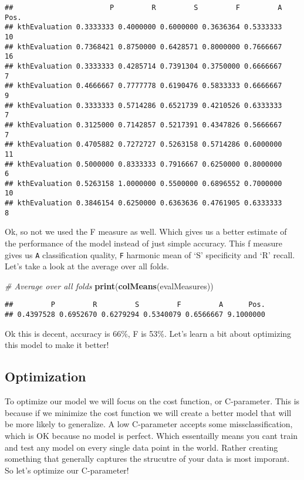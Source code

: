 \documentclass[
]{article}
\newenvironment{Shaded}{\begin{snugshade}}{\end{snugshade}}
\newcommand{\CommentTok}[1]{\textcolor[rgb]{0.56,0.35,0.01}{\textit{#1}}}
\newcommand{\KeywordTok}[1]{\textcolor[rgb]{0.13,0.29,0.53}{\textbf{#1}}}
\newcommand{\NormalTok}[1]{#1}
\begin{document}
\begin{verbatim}
##                       P         R         S         F         A Pos.
## kthEvaluation 0.3333333 0.4000000 0.6000000 0.3636364 0.5333333   10
## kthEvaluation 0.7368421 0.8750000 0.6428571 0.8000000 0.7666667   16
## kthEvaluation 0.3333333 0.4285714 0.7391304 0.3750000 0.6666667    7
## kthEvaluation 0.4666667 0.7777778 0.6190476 0.5833333 0.6666667    9
## kthEvaluation 0.3333333 0.5714286 0.6521739 0.4210526 0.6333333    7
## kthEvaluation 0.3125000 0.7142857 0.5217391 0.4347826 0.5666667    7
## kthEvaluation 0.4705882 0.7272727 0.5263158 0.5714286 0.6000000   11
## kthEvaluation 0.5000000 0.8333333 0.7916667 0.6250000 0.8000000    6
## kthEvaluation 0.5263158 1.0000000 0.5500000 0.6896552 0.7000000   10
## kthEvaluation 0.3846154 0.6250000 0.6363636 0.4761905 0.6333333    8
\end{verbatim}

Ok, so not we used the F measure as well. Which gives us a better
estimate of the performance of the model instead of just simple
accuracy. This f measure gives us \texttt{A} classification quality,
\texttt{F} harmonic mean of `S' specificity and `R' recall. Let's take a
look at the average over all folds.

\begin{Shaded}
\begin{Highlighting}[]
\CommentTok{# Average over all folds}
\KeywordTok{print}\NormalTok{(}\KeywordTok{colMeans}\NormalTok{(evalMeasures))}
\end{Highlighting}
\end{Shaded}

\begin{verbatim}
##         P         R         S         F         A      Pos. 
## 0.4397528 0.6952670 0.6279294 0.5340079 0.6566667 9.1000000
\end{verbatim}

Ok this is decent, accuracy is 66\%, F is 53\%. Let's learn a bit about
optimizing this model to make it better!

\hypertarget{optimization}{%
\subsection{Optimization}\label{optimization}}

To optimize our model we will focus on the cost function, or
C-parameter. This is because if we minimize the cost function we will
create a better model that will be more likely to generalize. A low
C-parameter accepts some missclassification, which is OK because no
model is perfect. Which essentailly means you cant train and test any
model on every single data point in the world. Rather creating something
that generally captures the strucutre of your data is most imporant. So
let's optimize our C-parameter!
\end{document}
